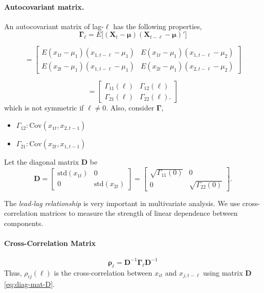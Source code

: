 \paragraph{Autocovariant matrix.} An autocovariant matrix of lag-$\ell$ has the following properties,
\[
\mathbf{\Gamma}_{\ell} = E\big[ (\mathbf{X}_t - \mathbf{\mu}) (\mathbf{X}_{t-\ell}-\mathbf{\mu})' \big]
\]

\begin{equation}
=
\begin{bmatrix}
E(x_{1t}-\mu_1)(x_{1,t-\ell}-\mu_1) & E(x_{1t}-\mu_1)(x_{1,t-\ell}-\mu_2) \\
E(x_{2t}-\mu_1)(x_{1,t-\ell}-\mu_1) & E(x_{2t}-\mu_1)(x_{2,t-\ell}-\mu_2)
\end{bmatrix}
\end{equation}

\[
=
\begin{bmatrix}
\Gamma_{11}(\ell) & \Gamma_{12}(\ell) \\
\Gamma_{21}(\ell) & \Gamma_{22}(\ell).
\end{bmatrix}
\]
which is not symmetric if $\ell \ne 0$. Also, consider $\mathbf{\Gamma}$,
\begin{itemize}
\item $\Gamma_{12}: \text{Cov}(x_{1t},x_{2,t-1})$ 
\item $\Gamma_{21}: \text{Cov}(x_{2t},x_{1,t-1})$ 
\end{itemize}

Let the diagonal matrix $\mathbf{D}$ be
\begin{equation}
\mathbf{D} = 
\begin{bmatrix}
\text{std}(x_{1t}) & 0 \\
0 & \text{std}(x_{2t})
\end{bmatrix}
=
\begin{bmatrix}
\sqrt{\Gamma_{11}(0)} & 0 \\
0 & \sqrt{\Gamma_{22}(0)}
\end{bmatrix}.
\label{eq:diag-mat-D}
\end{equation}

The \emph{lead-lag relationship} is very important in multivariate \fts{} analysis. We use cross-correlation matrices to measure the strength of linear dependence between components.

\paragraph{Cross-Correlation Matrix}
\[
\mathbf{\rho}_{\ell} = \mathbf{D}^{-1} \mathbf{\Gamma}_{\ell} \mathbf{D}^{-1}
\]
Thus, $\rho_{ij}(\ell)$ is the cross-correlation between $x_{it}$ and $x_{j,t-\ell}$ using matrix $\mathbf{D}$ \eqref{eq:diag-mat-D}.

